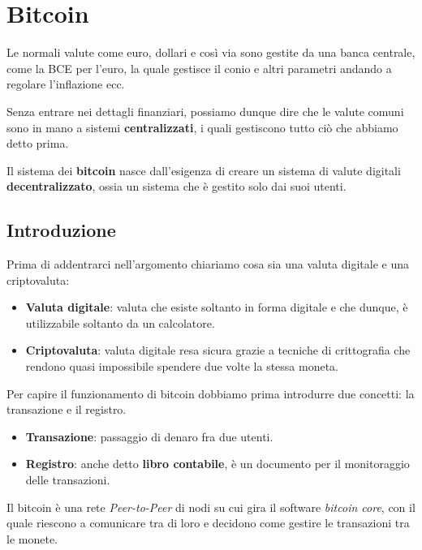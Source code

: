 \chapter{Bitcoin}
Le normali valute come euro, dollari e cos\`i via sono gestite da una banca centrale, come la BCE per l'euro, la quale
gestisce il conio e altri parametri andando a regolare l'inflazione ecc.

Senza entrare nei dettagli finanziari, possiamo dunque dire che le valute comuni sono in mano a sistemi
\textbf{centralizzati}, i quali gestiscono tutto ci\`o che abbiamo detto prima.

Il sistema dei \textbf{bitcoin} nasce dall'esigenza di creare un sistema di valute digitali \textbf{decentralizzato},
ossia un sistema che \`e gestito solo dai suoi utenti.

\section{Introduzione}
Prima di addentrarci nell'argomento chiariamo cosa sia una valuta digitale e una criptovaluta:
\begin{itemize}
	\item \textbf{Valuta digitale}: valuta che esiste soltanto in forma digitale e che dunque, \`e utilizzabile
	      soltanto da un calcolatore.
	\item \textbf{Criptovaluta}: valuta digitale resa sicura grazie a tecniche di crittografia che rendono quasi
	      impossibile spendere due volte la stessa moneta.
\end{itemize}
Per capire il funzionamento di bitcoin dobbiamo prima introdurre due concetti: la transazione e il registro.
\begin{itemize}
	\item \textbf{Transazione}: passaggio di denaro fra due utenti.
	\item \textbf{Registro}: anche detto \textbf{libro contabile}, \`e un documento per il monitoraggio delle
	      transazioni.
\end{itemize}
Il bitcoin \`e una rete \emph{Peer-to-Peer} di nodi su cui gira il software \emph{bitcoin core}, con il quale
riescono a comunicare tra di loro e decidono come gestire le transazioni tra le monete.

